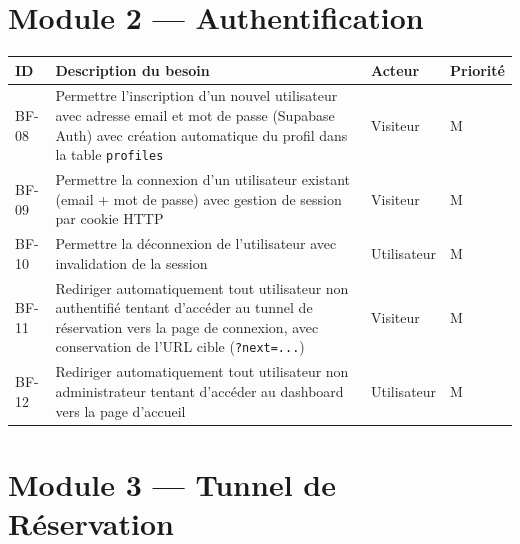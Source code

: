 \documentclass[12pt,a4paper,openany]{report}
\begin{document}
\section{Module 2 — Authentification}

\begin{longtable}{p{1cm}p{6.5cm}lp{3.5cm}}
  \toprule
  \textbf{ID} & \textbf{Description du besoin} & \textbf{Acteur} & \textbf{Priorité} \\
  \midrule
  \endhead
  \bottomrule
  \endfoot

  BF-08 & Permettre l'inscription d'un nouvel utilisateur avec adresse email et mot de passe (Supabase Auth) avec création automatique du profil dans la table \texttt{profiles} & Visiteur & M \\[4pt]

  BF-09 & Permettre la connexion d'un utilisateur existant (email + mot de passe) avec gestion de session par cookie HTTP & Visiteur & M \\[4pt]

  BF-10 & Permettre la déconnexion de l'utilisateur avec invalidation de la session & Utilisateur & M \\[4pt]

  BF-11 & Rediriger automatiquement tout utilisateur non authentifié tentant d'accéder au tunnel de réservation vers la page de connexion, avec conservation de l'URL cible (\texttt{?next=...}) & Visiteur & M \\[4pt]

  BF-12 & Rediriger automatiquement tout utilisateur non administrateur tentant d'accéder au dashboard vers la page d'accueil & Utilisateur & M \\
\end{longtable}

\section{Module 3 — Tunnel de Réservation}
\end{document}

